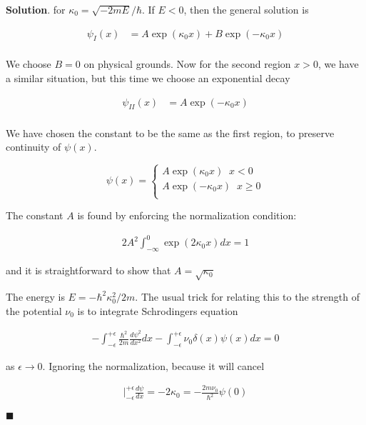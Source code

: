 \documentclass[12pt]{article}
\theoremstyle{definition}
\newenvironment{s}{%
        \begin{trivlist} \item \textbf{Solution}. }{%
            \hspace*{\fill} $\blacksquare$\end{trivlist}}%
\begin{document}
{\begin{s}
for $\kappa_{0} = \sqrt{-2mE}/\hbar$. If $E <0$, then the general solution is

\begin{align*}
\psi_{I}(x) &= A\exp(\kappa_{0} x) + B\exp(-\kappa_{0} x)\\
\end{align*}

We choose $B = 0$ on physical grounds. Now for the second region $x>0$, we have a similar situation, but this time we choose an exponential decay

\begin{align*}
\psi_{II}(x) &= A\exp(-\kappa_{0} x)\\
\end{align*}

We have chosen the constant to be the same as the first region, to preserve continuity of $\psi(x)$.

\begin{equation*}
\psi(x) = \begin{cases}
A\exp(\kappa_{0}x) \;\;x <0 \\
A\exp(-\kappa_{0}x) \;\; x\geq 0\\
\end{cases}
\end{equation*}

The constant $A$ is found by enforcing the normalization condition:

\begin{align*}
2A^{2}\int_{-\infty}^{0} \exp(2\kappa_{0}x)dx = 1
\end{align*}

and it is straightforward to show that $A = \sqrt{\kappa_{0}}$

The energy is $E = -\hbar^{2}\kappa_{0}^{2}/2m$. The usual trick for relating this to the strength of the potential $\nu_{0}$ is to integrate Schrodingers equation 

\begin{align*}
-\int_{-\epsilon}^{+\epsilon}\frac{\hbar^{2}}{2m}\frac{d\psi^{2}}{dx^{2}}dx - \int_{-\epsilon}^{+\epsilon}\nu_{0}\delta(x)\psi(x)dx = 0
\end{align*}

as $\epsilon \rightarrow 0$. Ignoring the normalization, because it will cancel

\begin{align*}
\bigg|_{-\epsilon}^{+\epsilon}\frac{d\psi}{dx} = -2\kappa_{0} = -\frac{2m\nu_{0}}{\hbar^{2}}\psi(0)
\end{align*}


\end{s}}
\end{document}
